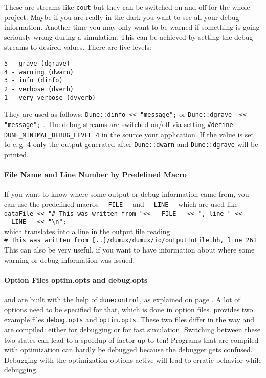   These are streams like \texttt{cout} but they can be switched on and off for the whole project. 
  Maybe if you are really in the  dark you want to see all your debug information. Another time you may only want to be warned if something is going seriously wrong during a simulation. 
  This can be achieved by setting the debug streams to desired values. There are five levels:
\begin{verbatim}
5 - grave (dgrave)
4 - warning (dwarn)
3 - info (dinfo)
2 - verbose (dverb)
1 - very verbose (dvverb)
\end{verbatim}

They are used as follows: \lstinline{Dune::dinfo << "message";} or \lstinline{Dune::dgrave  << "message";} .
The debug streams are switched on/off via  setting \lstinline{#define DUNE_MINIMAL_DEBUG_LEVEL 4}
in the source your application. If the value is set to e.\,g. 4 only the output generated after
\lstinline{Dune::dwarn} and \lstinline{Dune::dgrave} will be printed.


\paragraph{File Name and Line Number by Predefined Macro}
If you want to  know where some output or debug information came from, you can use the predefined macros \lstinline{__FILE__} and \lstinline{__LINE__}
which are used like\\
\lstinline{dataFile << "# This was written from "<< __FILE__ << ", line " << __LINE__ << "\n";}\\
which translates into a line in the output file reading\\
\lstinline{# This was written from [..]/dumux/dumux/io/outputToFile.hh, line 261}\\
This can also be very useful, if you want to have information about where some warning or debug information was issued. 

\paragraph{Option Files optim.opts and debug.opts}
\Dune and \Dumux are built with the help of \texttt{dunecontrol}, as explained on page \pageref{buildIt}.
A lot of options need to be specified for that, which is done in option files. \Dumux provides two example files
\texttt{debug.opts} and \texttt{optim.opts}. These two files differ in the way \Dune and \Dumux are compiled:
either for debugging or for fast simulation. Switching between these two states can lead to a speedup of factor up to ten!
Programs that are compiled with optimization can hardly be debugged because the debugger gets confused.
Debugging with the optimization options active will lead to erratic behavior while debugging. 

